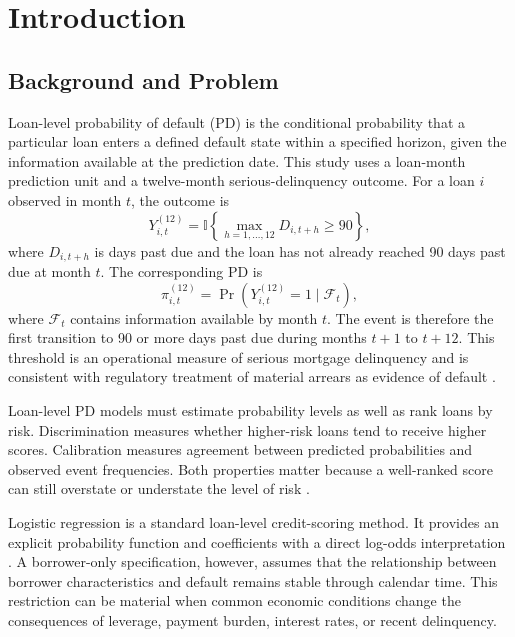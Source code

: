 \chapter{Introduction}
\label{chap:introduction}

\section{Background and Problem}

Loan-level probability of default (PD) is the conditional probability that a particular loan enters a defined default state within a specified horizon, given the information available at the prediction date. This study uses a loan-month prediction unit and a twelve-month serious-delinquency outcome. For a loan $i$ observed in month $t$, the outcome is
\begin{equation}
Y_{i,t}^{(12)}
=
\mathbb{I}\!\left\{\max_{h=1,\ldots,12}D_{i,t+h}\geq 90\right\},
\label{eq:intro-default-indicator}
\end{equation}
where $D_{i,t+h}$ is days past due and the loan has not already reached 90 days past due at month $t$. The corresponding PD is
\begin{equation}
\pi_{i,t}^{(12)}
=
\Pr\!\left(Y_{i,t}^{(12)}=1\mid\mathcal{F}_{t}\right),
\label{eq:intro-pd-target}
\end{equation}
where $\mathcal{F}_{t}$ contains information available by month $t$. The event is therefore the first transition to 90 or more days past due during months $t+1$ to $t+12$. This threshold is an operational measure of serious mortgage delinquency and is consistent with regulatory treatment of material arrears as evidence of default \citep{bcbs_qis3_default,fed_basel2_default}.

Loan-level PD models must estimate probability levels as well as rank loans by risk. Discrimination measures whether higher-risk loans tend to receive higher scores. Calibration measures agreement between predicted probabilities and observed event frequencies. Both properties matter because a well-ranked score can still overstate or understate the level of risk \citep{brier1950,gneiting_raftery_2007,van_calster_2019}.

Logistic regression is a standard loan-level credit-scoring method. It provides an explicit probability function and coefficients with a direct log-odds interpretation \citep{hand_henley_1997,thomas2000survey,costa2020logistic}. A borrower-only specification, however, assumes that the relationship between borrower characteristics and default remains stable through calendar time. This restriction can be material when common economic conditions change the consequences of leverage, payment burden, interest rates, or recent delinquency.

